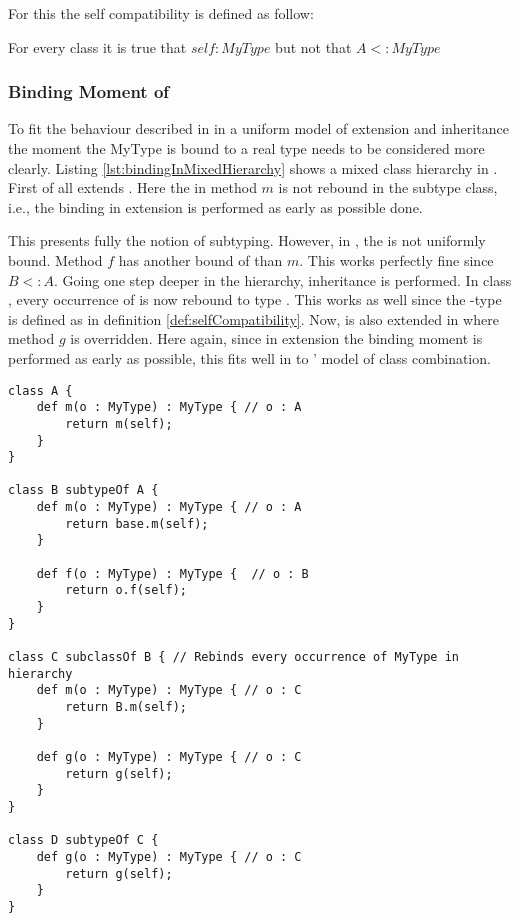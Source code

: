 For this the self compatibility is defined as follow:

\begin{defn}
	\label{def:selfCompatibility}
	For every class \A it is true that $self : MyType$ but not that $A <: MyType$
\end{defn}

\subsubsection{Binding Moment of \mytype}
To fit the behaviour described in  in a
uniform model of extension and inheritance the moment the MyType is
bound to a real type needs to be considered more clearly. Listing
\ref{lst:bindingInMixedHierarchy} shows a mixed class hierarchy in
\ooplss. First of all \B extends \A. Here the \mytype in method $m$ is
not rebound in the subtype class, i.e., the \mytype binding in extension
is performed as early as possible done.

This presents fully the notion of subtyping. However, in \B, the \mytype
is not uniformly bound. Method $f$ has another bound of \mytype than
$m$. This works perfectly fine since $B <: A$. Going one step deeper in
the hierarchy, inheritance is performed. In class \C, every occurrence
of \mytype is now rebound to type \C. This works as well since the
\self-type is defined as in definition \ref{def:selfCompatibility}. Now,
\C is also extended in \D where method $g$ is overridden. Here again,
since in extension the binding moment is performed as early as possible,
this fits well in to \ooplss' model of class combination.

\begin{lstlisting}[float,language=ooplss,caption=Binding of \self and \mytype in a mixed context,label=lst:bindingInMixedHierarchy]
class A {
	def m(o : MyType) : MyType { // o : A
		return m(self); 
	}
}

class B subtypeOf A {
	def m(o : MyType) : MyType { // o : A
		return base.m(self);
	}

	def f(o : MyType) : MyType {  // o : B
		return o.f(self); 
	}
}

class C subclassOf B { // Rebinds every occurrence of MyType in hierarchy
	def m(o : MyType) : MyType { // o : C
		return B.m(self);
	}

	def g(o : MyType) : MyType { // o : C
		return g(self);
	}
}

class D subtypeOf C {
	def g(o : MyType) : MyType { // o : C
		return g(self);
	}
}
\end{lstlisting}

